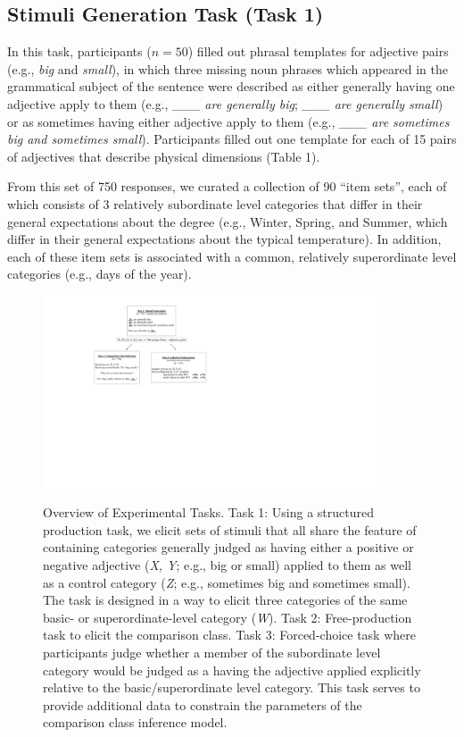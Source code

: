 \documentclass[doc]{apa6}
\begin{document}
\subsection{Stimuli Generation Task (Task 1)}

In this task, participants ($n=50$) filled out phrasal templates for adjective pairs (e.g., \emph{big} and \emph{small}), in which three missing noun phrases which appeared in the grammatical subject of the sentence were described as either generally having one adjective apply to them (e.g., \emph{\_\_\_ are generally big}; \emph{\_\_\_ are generally small}) or as sometimes having either adjective apply to them (e.g., \emph{\_\_\_ are sometimes big and sometimes small}). 
Participants filled out one template for each of 15 pairs of adjectives that describe physical dimensions (Table 1). 

From this set of 750 responses, we curated a collection of 90 ``item sets'', each of which consists of 3 relatively subordinate level categories that differ in their general expectations about the degree (e.g., Winter, Spring, and Summer, which differ in their general expectations about the typical temperature). In addition, each of these item sets is associated with a common, relatively superordinate level categories (e.g., days of the year).

\begin{figure}[htb]
{\centering \includegraphics[width=0.9\textwidth]{figs/expt_overview} }
\caption{\small Overview of Experimental Tasks. Task 1: Using a structured production task, we elicit sets of stimuli that all share the feature of containing categories generally judged as having either a positive or negative adjective  (\emph{X, Y}; e.g., big or small) applied to them as well as a control category (\emph{Z}; e.g., sometimes big and sometimes small). The task is designed in a way to elicit three categories of the same basic- or superordinate-level category (\emph{W}). Task 2: Free-production task to elicit the comparison class. Task 3: Forced-choice task where participants judge whether a member of the subordinate level category would be judged as a having the adjective applied explicitly relative to the basic/superordinate level category. This task serves to provide additional data to constrain the parameters of the comparison class inference model. }\label{fig:exptOverview}
\end{figure}
\end{document}

